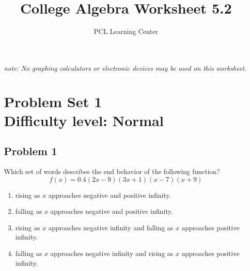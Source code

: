 \documentclass[12pt]{article}
\title{College Algebra Worksheet 5.2}
\author{PCL Learning Center}
\date{}
\begin{document}
\maketitle

\begin{center}
    \textit{note: No graphing calculators or electronic devices may be used on this worksheet.}    
\end{center}

\section*{Problem Set 1\\Difficulty level: Normal}
\subsection*{Problem 1}
Which set of words describes the end behavior of the following function?
\[f(x)=0.4(2x-9)(3x+1)(x-7)(x+9)\]
\begin{enumerate}[label=(\alph*)]
    \item rising as $x$ approaches negative and positive infinity.
    \item falling as $x$ approaches negative and positive infinity.
    \item rising as $x$ approaches negative infinity and falling as $x$ approaches positive infinity.
    \item falling as $x$ approaches negative infinity and rising as $x$ approaches positive infinity.
\end{enumerate}
\end{document}
